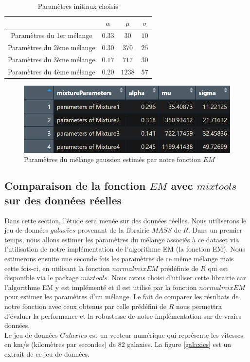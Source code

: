 \documentclass[a4paper,french,10pt]{article}
\begin{document}
\begin{table}[htp]
	\center
	\begin{tabular}{|c||c|c|c|}
		\hline
		& $\alpha$ & $\mu$ & $\sigma$\\
		\hline
		Paramètres du 1er mélange & $0.33$ & $30$ & $10$ \\
		\hline
		Paramètres du 2ème mélange & $0.30$ & $370$ & $25$ \\
		\hline
		Paramètres du 3ème mélange & $0.17$ & $717$ & $30$ \\
		\hline
		Paramètres du 4ème mélange & $0.20$ & $1238$ & $57$ \\
		\hline
	\end{tabular}
	\caption{Paramètres initiaux choisis}
	\label{tab4}
\end{table}

\begin{figure}[htp] 
	\centering
	\includegraphics[scale=0.8]{images/res_sim2.png}
	\caption{Paramètres du mélange gaussien estimés par notre fonction $EM$}
	\label{res_sim2}
\end{figure}




\subsection{Comparaison de la fonction $EM$ avec $mixtools$ sur des données réelles}
Dans cette section, l'étude sera menée sur des données réelles. Nous utiliserons le jeu de données $galaxies$ provenant de la librairie $MASS$ de $R$. Dans un premier temps, nous allons estimer les paramètres du mélange associés à ce dataset via l'utilisation de notre implémentation de l'algorithme EM (la fonction EM). Nous estimerons ensuite une seconde fois les paramètres de ce même mélange mais cette fois-ci, en utilisant la fonction $normalmixEM$ prédéfinie de $R$ qui est disponible via le package $mixtools$. Nous avons choisi d'utiliser cette librairie car l'algorithme EM y est implémenté et il est utilisé par la fonction $normalmixEM$ pour estimer les paramètres d'un mélange. Le fait de comparer les résultats de notre fonction avec ceux obtenus par celle prédéfini de $R$ nous permettra d'évaluer la performance et la robustesse de notre implémentation sur de vraies données.\\
Le jeu de données $Galaxies$ est un vecteur numérique qui représente les vitesses en km/s (kilomètres par secondes) de $82$ galaxies. La figure \ref{galaxies} est un extrait de ce jeu de données.
\end{document}
